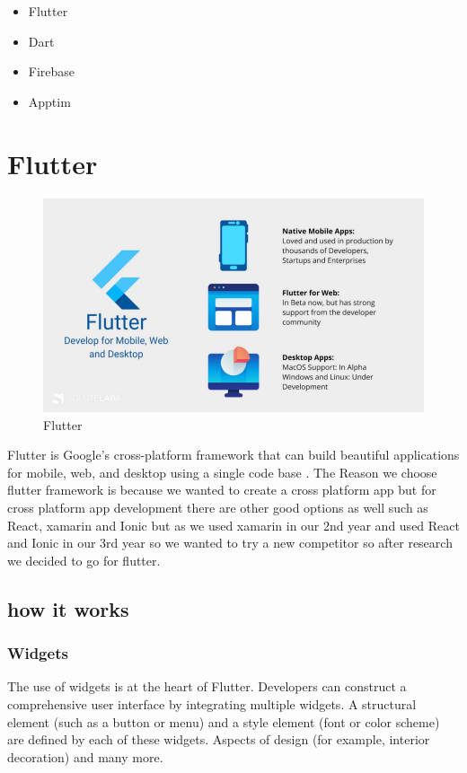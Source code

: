 \begin{itemize}
\item Flutter
\item Dart
\item Firebase
\item Apptim
\end{itemize}

\section{Flutter}
\begin{figure}[!htb]
    \centering
    \includegraphics[scale=0.15]{img/Flutter.png}
    \caption{Flutter}
    \label{fig:Flutter}
\end{figure}
Flutter is Google's cross-platform framework that can build beautiful applications for mobile, web, and desktop using a single code base  \cite{FlutterGoogle:online}. The Reason we choose flutter framework is because we wanted to create a cross platform app but for cross platform app development there are other good options as well such as React, xamarin and Ionic but as we used xamarin in our 2nd year and used React and Ionic in our 3rd year so we wanted to try a new competitor so after research we decided to go for flutter.
\subsection{how it works}
\subsubsection{Widgets}
The use of widgets is at the heart of Flutter. Developers can construct a comprehensive user interface by integrating multiple widgets. A structural element (such as a button or menu) and a style element (font or color scheme) are defined by each of these widgets. Aspects of design (for example, interior decoration) and many more.

